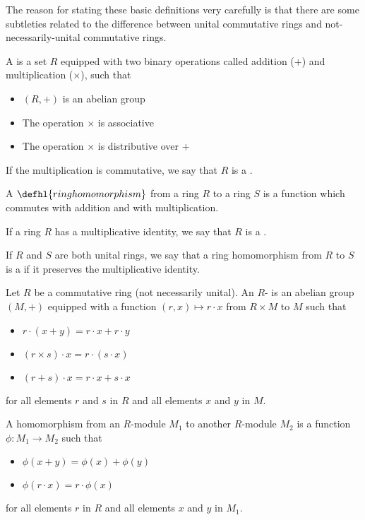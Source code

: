 \documentclass[a4paper]{article}
\begin{document}
The reason for stating these basic definitions very carefully is that there are some subtleties related to the difference between unital commutative rings and not-necessarily-unital commutative rings.




\begin{definition}
A  is a set $R$ equipped with two binary operations called addition ($+$) and multiplication ($\times$), such that 
\begin{itemize}
\item $(R, +)$ is an abelian group
\item The operation $\times$ is associative
\item The operation $\times$ is distributive over $+$
\end{itemize}
If the multiplication is commutative, we say that $R$ is a .

A $\defhl{ring homomorphism}$ from a ring $R$ to a ring $S$ is a function which commutes with addition and with multiplication.

If a ring $R$ has a multiplicative identity, we say that $R$ is a .

If $R$ and $S$ are both unital rings, we say that a ring homomorphism from $R$ to $S$ is a  if it preserves the multiplicative identity.

\end{definition}



\begin{definition}
Let $R$ be a commutative ring (not necessarily unital). An $R$- is an abelian group $(M, +)$ equipped with a function $(r, x) \mapsto r\cdot x$ from $R \times M$ to $M$ such that
\begin{itemize}
\item $r \cdot (x+y) = r \cdot x + r \cdot y$
\item $(r \times s) \cdot x = r \cdot (s \cdot x)$
\item $ (r+s) \cdot x = r \cdot x + s \cdot x$
\end{itemize}
for all elements $r$ and $s$ in $R$ and all elements $x$ and $y$ in $M$.

A homomorphism from an $R$-module $M_1$ to another $R$-module $M_2$ is a function $\phi : M_1 \to M_2$ such that 
\begin{itemize}
\item $\phi(x+y) = \phi(x) + \phi(y)$
\item $\phi(r \cdot x) = r \cdot \phi(x)$
\end{itemize}
for all elements $r$ in $R$ and all elements $x$ and $y$ in $M_1$.

\end{definition}
\end{document}
